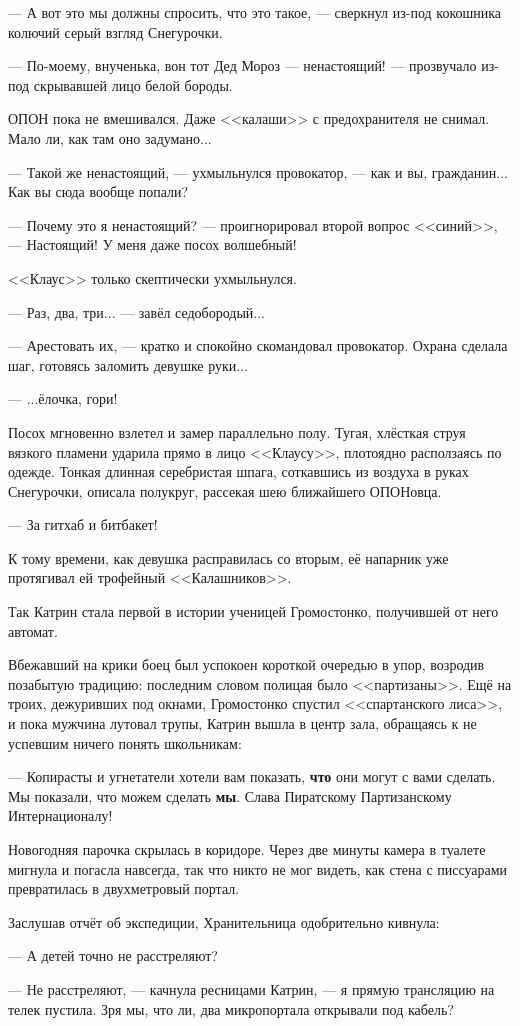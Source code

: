 --- А вот это мы должны спросить, что это такое, --- сверкнул из-под кокошника колючий серый взгляд Снегурочки.

--- По-моему, внученька, вон тот Дед Мороз --- ненастоящий! --- прозвучало из-под скрывавшей лицо белой бороды.

ОПОН пока не вмешивался. Даже <<калаши>> с предохранителя не снимал. Мало ли, как там оно задумано...

--- Такой же ненастоящий, --- ухмыльнулся провокатор, --- как и вы, гражданин... Как вы сюда вообще попали?

--- Почему это я ненастоящий? --- проигнорировал второй вопрос <<синий>>, --- Настоящий! У меня даже посох волшебный!

<<Клаус>> только скептически ухмыльнулся.

--- Раз, два, три... --- завёл седобородый...

--- Арестовать их, --- кратко и спокойно скомандовал провокатор. Охрана сделала шаг, готовясь заломить девушке руки...

--- ...ёлочка, гори!

\emptypar

Посох мгновенно взлетел и замер параллельно полу.
Тугая, хлёсткая струя вязкого пламени ударила прямо в лицо <<Клаусу>>, плотоядно расползаясь по одежде.
Тонкая длинная серебристая шпага, соткавшись из воздуха в руках Снегурочки, описала полукруг, рассекая шею ближайшего ОПОНовца.


--- За гитхаб и битбакет! 

К тому времени, как девушка расправилась со вторым, её напарник уже протягивал ей трофейный <<Калашников>>.

Так Катрин стала первой в истории ученицей Громостонко, получившей от него автомат.

Вбежавший на крики боец был успокоен короткой очередью в упор, возродив позабытую традицию:
последним словом полицая было <<партизаны>>.
Ещё на троих, дежуривших под окнами, Громостонко спустил <<спартанского лиса>>, и пока мужчина лутовал трупы,
Катрин вышла в центр зала, обращаясь к не успевшим ничего понять школьникам:

--- Копирасты и угнетатели хотели вам показать, \textbf{что} они могут с вами сделать.
Мы показали, что можем сделать \textbf{мы}. Слава Пиратскому Партизанскому Интернационалу!

Новогодняя парочка скрылась в коридоре.
Через две минуты камера в туалете мигнула и погасла навсегда, так что никто не мог видеть,
как стена с писсуарами превратилась в двухметровый портал.

\emptypar

Заслушав отчёт об экспедиции, Хранительница одобрительно кивнула:

--- А детей точно не расстреляют?

--- Не расстреляют, --- качнула ресницами Катрин, --- я прямую трансляцию на телек пустила.
Зря мы, что ли, два микропортала открывали под кабель?

\emptypar

\emptypar
